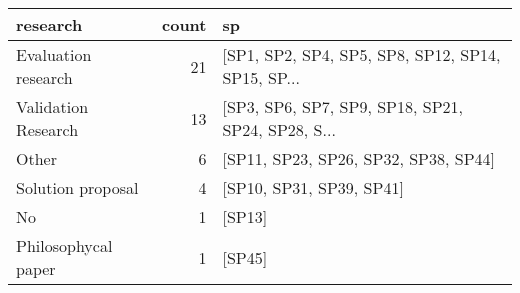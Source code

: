 \begin{tabular}{lrl}
\toprule
            research &  count &                                                 sp \\
\midrule
 Evaluation research &     21 &  [SP1, SP2, SP4, SP5, SP8, SP12, SP14, SP15, SP... \\
 Validation Research &     13 &  [SP3, SP6, SP7, SP9, SP18, SP21, SP24, SP28, S... \\
               Other &      6 &               [SP11, SP23, SP26, SP32, SP38, SP44] \\
   Solution proposal &      4 &                           [SP10, SP31, SP39, SP41] \\
                  No &      1 &                                             [SP13] \\
 Philosophycal paper &      1 &                                             [SP45] \\
\bottomrule
\end{tabular}
